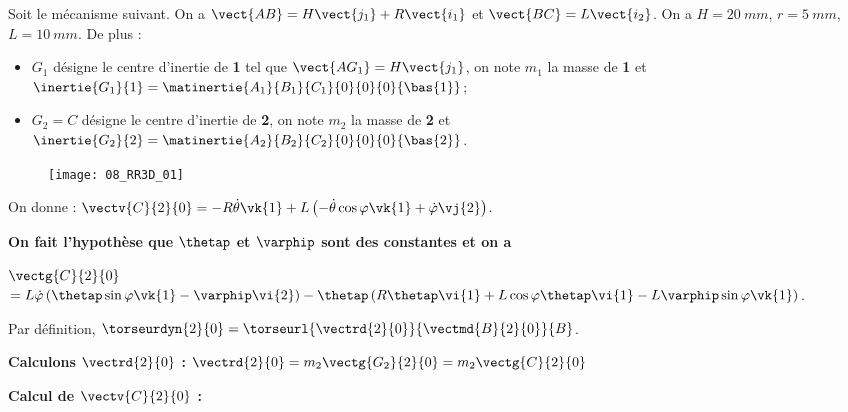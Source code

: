 \normalfalse \difficiletrue \tdifficilefalse
\correctionfalse


\setcounter{question}{0}%
\ifcorrection
\else
{}
\fi

\ifprof
\else
Soit le mécanisme suivant. On a $\vect{AB}=H\vect{j_1}+R\vect{i_1}$ et $\vect{BC}=L\vect{i_2}$. On a $H=\SI{20}{mm}$, $r=\SI{5}{mm}$, $L=\SI{10}{mm}$. De plus :
\begin{itemize}
\item $G_1$ désigne le centre d'inertie de \textbf{1} tel que $\vect{AG_1}=H\vect{j_1}$, on note $m_1$ la masse de \textbf{1} et $\inertie{G_1}{1}=\matinertie{A_1}{B_1}{C_1}{0}{0}{0}{\bas{1}}$; 
\item $G_2=C$ désigne le centre d'inertie de \textbf{2}, on note $m_2$ la masse de \textbf{2} et $\inertie{G_2}{2}=\matinertie{A_2}{B_2}{C_2}{0}{0}{0}{\bas{2}}$.
\end{itemize}
\begin{figure}[H]
\texttt{[image: 08\_RR3D\_01]}
\end{figure}

\ifcolle
\else
On donne : 
$\vectv{C}{2}{0} = -R\dot{\theta}\vk{1}+L\left(-\dot{\theta}\cos\varphi\vk{1} + \dot{\varphi}\vj{2}\right)$.

\textbf{On fait l'hypothèse que $\thetap$ et $\varphip$ sont des constantes et on a }

$\vectg{C}{2}{0} $
$ =L\dot{\varphi}\left(\thetap\sin\varphi\vk{1}-\varphip\vi{2}\right)
-\thetap\left( R \thetap\vi{1} +L\cos\varphi \thetap\vi{1}
-L\varphip\sin\varphi\vk{1}\right)
$.
\fi


\fi

\ifprof


Par définition, $\torseurdyn{2}{0} = \torseurl{\vectrd{2}{0}}{\vectmd{B}{2}{0}}{B}$.

\textbf{Calculons $\vectrd{2}{0}$ : } 
$\vectrd{2}{0} = m_2\vectg{G_2}{2}{0}=m_2 \vectg{C}{2}{0} $

\textbf{Calcul de $\vectv{C}{2}{0}$ : }  

